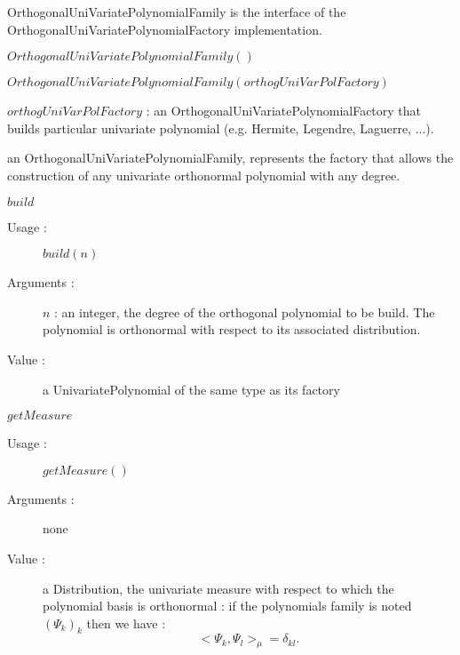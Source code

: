 OrthogonalUniVariatePolynomialFamily is the interface of the OrthogonalUniVariatePolynomialFactory implementation.
\begin{description}
\item[Usage :] \rule{0pt}{1em}
  \begin{description}
  \item $OrthogonalUniVariatePolynomialFamily()$
  \item $OrthogonalUniVariatePolynomialFamily(orthogUniVarPolFactory)$
  \end{description}

\item[Arguments :]  \rule{0pt}{1em}
  \begin{description}
  \item $orthogUniVarPolFactory$ : an OrthogonalUniVariatePolynomialFactory that builds particular univariate polynomial (e.g. Hermite, Legendre, Laguerre, ...).
  \end{description}

\item[Value :]  an OrthogonalUniVariatePolynomialFamily, represents the factory that allows the construction of any univariate orthonormal polynomial with any degree.

\item[Some methods :]  \rule{0pt}{1em}

  \begin{description}

  \item $build$
    \begin{description}
    \item[Usage :] $build(n)$
    \item[Arguments :] $n$ : an integer, the degree of the orthogonal polynomial to be build. The polynomial is orthonormal with respect to its associated distribution.
    \item[Value :]  a UnivariatePolynomial of the same type as its factory
    \end{description}
    \bigskip

  \item $getMeasure$
    \begin{description}
    \item[Usage :] $getMeasure()$
    \item[Arguments :] none
    \item[Value :]  a Distribution, the univariate measure with respect to which the polynomial basis is orthonormal : if the polynomials family is noted $(\Psi_k)_k$ then we have :
\begin{equation}\label{ortono}
<\Psi_k, \Psi_l>_{\mu}  = \delta_{kl}.
\end{equation}
    \end{description}
    \bigskip


\end{description}
\end{description}
